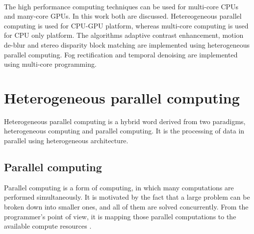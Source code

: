 \paragraph*{} The high performance computing techniques can be used for multi-core CPUs and many-core GPUs. In this work both are discussed. Hetereogeneous parallel computing is used for CPU-GPU platform, whereas multi-core computing is used for CPU only platform. The algorithms adaptive contrast enhancement, motion de-blur and stereo disparity block matching are implemented using heterogeneous parallel computing. Fog rectification and temporal denoising are implemented using multi-core programming. 
\section{Heterogeneous parallel computing}
Heterogeneous parallel computing is a hybrid word derived from two paradigms, heterogeneous computing and parallel computing. It is the processing of data in parallel using heterogeneous architecture.
\subsection{Parallel computing}
 Parallel computing is a form of computing, in which many computations are performed simultaneously. It is motivated by the fact that a large problem can be broken down into smaller ones, and all of them are solved concurrently. From the programmer’s point of view, it is mapping those parallel computations to the available compute resources \cite{ProfessionalCUDA}.

